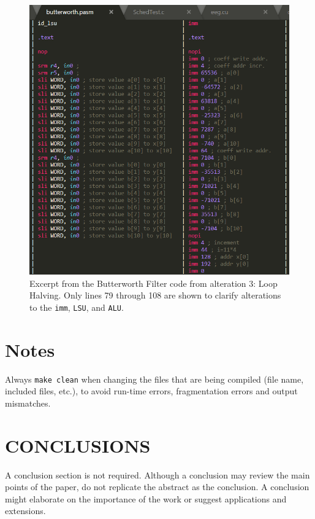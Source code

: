 \documentclass[letterpaper, 10 pt, conference]{ieeeconf}  %
\begin{document}
\begin{figure}[h]
\begin{center}
\includegraphics[scale=0.35]{images/assem01.png}
\caption{Excerpt from the Butterworth Filter code from alteration 3: Loop Halving. Only lines 79 through 108 are shown to clarify alterations to the \texttt{imm}, \texttt{LSU}, and \texttt{ALU}.}
\label{fig:TODO}
\end{center}
\end{figure}





\section{Notes}
Always \texttt{make clean} when changing the files that are being compiled (file name, included files, etc.), to avoid run-time errors, fragmentation errors and output mismatches.


\section{CONCLUSIONS}

A conclusion section is not required. Although a conclusion may review the main points of the paper, do not replicate the abstract as the conclusion. A conclusion might elaborate on the importance of the work or suggest applications and extensions. 
\end{document}
